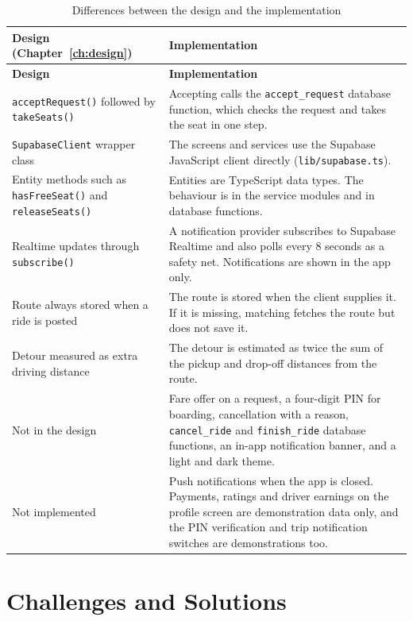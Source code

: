 \begingroup\small
\begin{longtable}{@{}>{\raggedright\arraybackslash}p{}
                   >{\raggedright\arraybackslash}p{}@{}}
\caption{Differences between the design and the implementation}\label{tab:differences}\\
\toprule
\textbf{Design (Chapter~\ref{ch:design})} & \textbf{Implementation} \\
\midrule
\endfirsthead
\toprule
\textbf{Design} & \textbf{Implementation} \\
\midrule
\endhead
\bottomrule
\endfoot
\texttt{acceptRequest()} followed by \texttt{takeSeats()} & Accepting calls the \texttt{accept\_request} database function, which checks the request and takes the seat in one step. \\
\texttt{SupabaseClient} wrapper class & The screens and services use the Supabase JavaScript client directly (\texttt{lib/supabase.ts}). \\
Entity methods such as \texttt{hasFreeSeat()} and \texttt{releaseSeats()} & Entities are TypeScript data types. The behaviour is in the service modules and in database functions. \\
Realtime updates through \texttt{subscribe()} & A notification provider subscribes to Supabase Realtime and also polls every 8 seconds as a safety net. Notifications are shown in the app only. \\
Route always stored when a ride is posted & The route is stored when the client supplies it. If it is missing, matching fetches the route but does not save it. \\
Detour measured as extra driving distance & The detour is estimated as twice the sum of the pickup and drop-off distances from the route. \\
Not in the design & Fare offer on a request, a four-digit PIN for boarding, cancellation with a reason, \texttt{cancel\_ride} and \texttt{finish\_ride} database functions, an in-app notification banner, and a light and dark theme. \\
Not implemented & Push notifications when the app is closed. Payments, ratings and driver earnings on the profile screen are demonstration data only, and the PIN verification and trip notification switches are demonstrations too. \\
\end{longtable}
\endgroup
 
\section{Challenges and Solutions}
 
